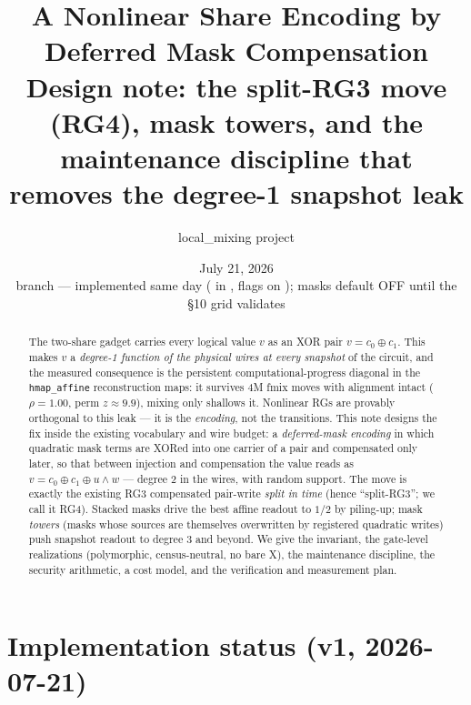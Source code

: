 \documentclass[11pt]{article}
\title{\textbf{A Nonlinear Share Encoding by Deferred Mask Compensation}\\[2pt]
\large Design note: the split-RG3 move (RG4), mask towers, and the
maintenance discipline that removes the degree-1 snapshot leak}
\author{local\_mixing project}
\date{July 21, 2026 \\ \small branch \code{ssg-gen-mix-clean} ---
implemented same day (\code{MaskLedger} in \code{src/replace/gadgets.rs},
flags on \code{sss --cnot}); masks default OFF until the \S10 grid
validates}
\newcommand{\code}[1]{\texttt{#1}}
\begin{document}
\maketitle

\begin{abstract}
\noindent The two-share gadget carries every logical value $v$ as an XOR
pair $v = c_0 \oplus c_1$. This makes $v$ a \emph{degree-1 function of the
physical wires at every snapshot} of the circuit, and the measured
consequence is the persistent computational-progress diagonal in the
\code{hmap\_affine} reconstruction maps: it survives 4M fmix moves with
alignment intact ($\rho = 1.00$, perm $z \approx 9.9$), mixing only
shallows it. Nonlinear RGs are provably orthogonal to this leak --- it is
the \emph{encoding}, not the transitions. This note designs the fix inside
the existing vocabulary and wire budget: a \emph{deferred-mask encoding} in
which quadratic mask terms are XORed into one carrier of a pair and
compensated only later, so that between injection and compensation the
value reads as $v = c_0 \oplus c_1 \oplus u{\wedge}w$ --- degree 2 in the
wires, with random support. The move is exactly the existing RG3
compensated pair-write \emph{split in time} (hence ``split-RG3''; we call
it RG4). Stacked masks drive the best affine readout to $1/2$ by
piling-up; mask \emph{towers} (masks whose sources are themselves
overwritten by registered quadratic writes) push snapshot readout to
degree 3 and beyond. We give the invariant, the gate-level realizations
(polymorphic, census-neutral, no bare X), the maintenance discipline, the
security arithmetic, a cost model, and the verification and measurement
plan.
\end{abstract}

\section*{Implementation status (v1, 2026-07-21)}
\end{document}
